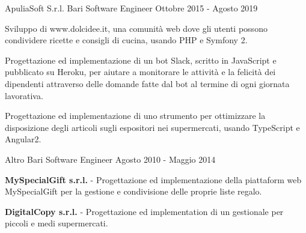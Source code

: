 \documentclass{resume} %
\begin{document}
\cvEntry
  {ApuliaSoft S.r.l.}
  {Bari}
  {Software Engineer}
  {Ottobre 2015 - Agosto 2019}{
    \begin{cvEntryItems}
      \item Sviluppo di www.dolcidee.it, una comunit\`a web dove gli utenti possono condividere
            ricette e consigli di cucina, usando PHP e Symfony 2.
      \item Progettazione ed implementazione di un bot Slack, scritto in JavaScript e pubblicato
            su Heroku, per aiutare a monitorare le attivit\`a e la felicit\`a dei dipendenti
            attraverso delle domande fatte dal bot al termine di ogni giornata lavorativa.
      \item Progettazione ed implementazione di uno strumento per ottimizzare la disposizione
            degli articoli sugli espositori nei supermercati, usando TypeScript e Angular2.
    \end{cvEntryItems}
}


\cvEntry
  {Altro}
  {Bari}
  {Software Engineer}
  {Agosto 2010 - Maggio 2014}{
    \begin{cvEntryItems}
      \item \textbf{MySpecialGift s.r.l.} - Progettazione ed implementazione della piattaform web MySpecialGift
            per la gestione e condivisione delle proprie liste regalo.
      \item \textbf{DigitalCopy s.r.l.} - Progettazione ed implementation di un gestionale per
            piccoli e medi supermercati.
    \end{cvEntryItems}
}



\end{document}
